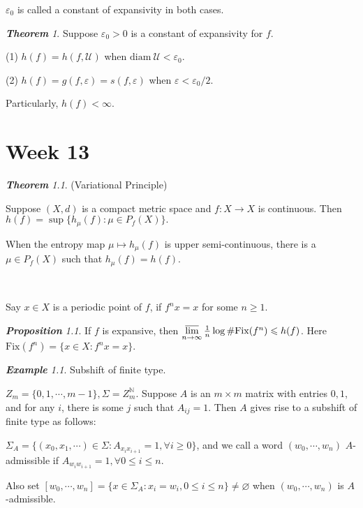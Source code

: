 \documentclass[10pt, a4paper, oneside]{report}
\numberwithin{equation}{chapter}
\theoremstyle{remark}
\newtheorem{theorem}[definition]{\bf{Theorem}}
\newtheorem{proposition}[definition]{\bf{Proposition}}
\theoremstyle{remark}
\newtheorem{example}{\bf{Example}}[chapter]
\begin{document}
$\varepsilon_0$ is called a constant of expansivity in both cases.

\begin{theorem}
    Suppose $\varepsilon_0>0$ is a constant of expansivity for $f$.

    (1) $h(f)=h(f,\mathcal{U})$ when $\mathrm{diam}~\mathcal{U}<\varepsilon_0.$

    (2) $h(f)=g(f,\varepsilon)=s(f,\varepsilon)$ when $\varepsilon<\varepsilon_0/2$.

    Particularly, $h(f)<\infty.$
\end{theorem}

\chapter{Week 13}
\begin{theorem}
(Variational Principle)

Suppose $(X,d)$ is a compact metric space and $f:X\rightarrow X$ is continuous. Then $h(f)=\sup\{h_\mu(f):\mu\in P_f(X)\}.$
\end{theorem}

When the entropy map $\mu\mapsto h_\mu(f)$ is upper semi-continuous, there is a $\mu\in P_f(X)$ such that $h_\mu(f)=h(f).$

~

Say $x\in X$ is a periodic point of $f$, if $f^nx=x$ for some $n\geqslant 1$.

\begin{proposition}
    If $f$ is expansive, then $\varlimsup\limits_{n\to\infty}\frac{1}{n}\log\#\mathrm{Fix}(f^n)\leqslant h(f)$. Here $\mathrm{Fix}(f^n)=\{x\in X:f^nx=x\}.$
\end{proposition}
    
\begin{example}
    Subshift of finite type.

    $Z_m=\{0,1,\cdots,m-1\},\Sigma=Z_m^\mathbb{N}$. Suppose $A$ is an $m\times m$ matrix with entries $0,1$, and for any $i$, there is some $j$ such that $A_{ij}=1$. Then $A$ gives rise to a subshift of finite type as follows:

    $\Sigma_A=\{(x_0,x_1,\cdots)\in\Sigma:A_{x_ix_{i+1}}=1,\forall i\geqslant 0\}$, and we call a word $(w_0,\cdots,w_n)$ $A$-admissible if $A_{w_iw_{i+1}}=1,\forall 0\leqslant i\leqslant n$.

    Also set $[w_0,\cdots,w_n]=\{x\in\Sigma_A:x_i=w_i,0\leqslant i\leqslant n\}\not=\varnothing$ when $(w_0,\cdots,w_n)$ is $A$-admissible.
\end{example}
\end{document}

